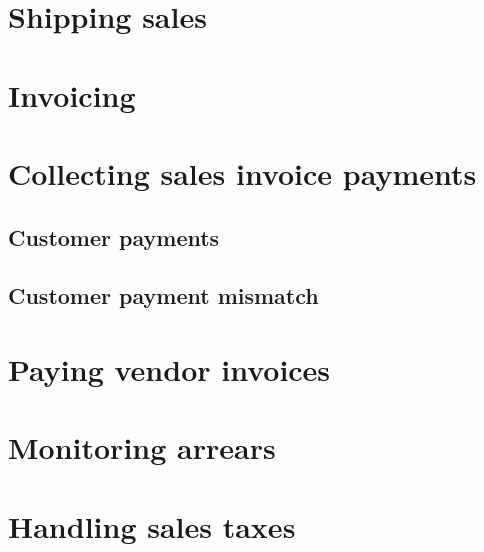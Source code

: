 
\chapter{Shipping sales}

\chapter{Invoicing}

\chapter{Collecting sales invoice payments}

\section{Customer payments}

\section{Customer payment mismatch}





\chapter{Paying vendor invoices}




\chapter{Monitoring arrears}


\chapter{Handling sales taxes}

